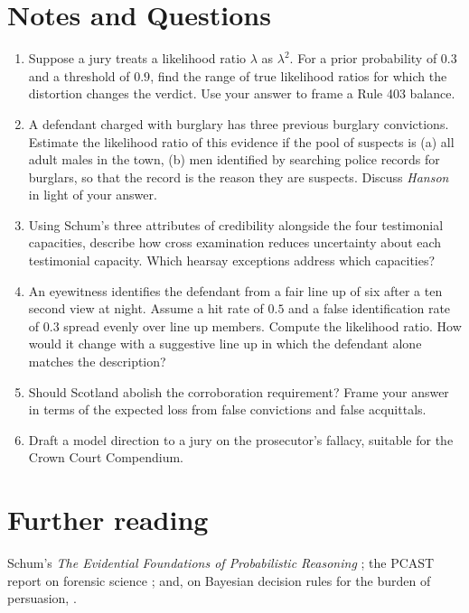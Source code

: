 \section*{Notes and Questions}
\begin{enumerate}[label=\arabic*.]
\item Suppose a jury treats a likelihood ratio $\lambda$ as $\lambda^2$. For a prior probability of $0.3$ and a threshold of $0.9$, find the range of true likelihood ratios for which the distortion changes the verdict. Use your answer to frame a Rule 403 balance.
\item A defendant charged with burglary has three previous burglary convictions. Estimate the likelihood ratio of this evidence if the pool of suspects is (a) all adult males in the town, (b) men identified by searching police records for burglars, so that the record is the reason they are suspects. Discuss \emph{Hanson} in light of your answer.
\item Using Schum's three attributes of credibility alongside the four testimonial capacities, describe how cross examination reduces uncertainty about each testimonial capacity. Which hearsay exceptions address which capacities?
\item An eyewitness identifies the defendant from a fair line up of six after a ten second view at night. Assume a hit rate of $0.5$ and a false identification rate of $0.3$ spread evenly over line up members. Compute the likelihood ratio. How would it change with a suggestive line up in which the defendant alone matches the description?
\item Should Scotland abolish the corroboration requirement? Frame your answer in terms of the expected loss from false convictions and false acquittals.
\item Draft a model direction to a jury on the prosecutor's fallacy, suitable for the Crown Court Compendium.
\end{enumerate}

\section*{Further reading}
Schum's \emph{The Evidential Foundations of Probabilistic Reasoning} \citep{schum1994}; the PCAST report on forensic science \citep{pcast2016}; and, on Bayesian decision rules for the burden of persuasion, \citet{kaye1999}.
